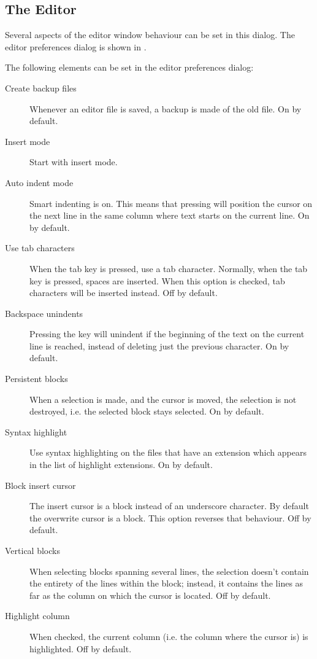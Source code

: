 \subsection{The Editor}
Several aspects of the editor window behaviour can be set in this dialog.
The editor preferences dialog is shown in .


The following elements can be set in the editor preferences dialog:
\begin{description}
\item[Create backup files]
Whenever an editor file is saved, a backup is made of the old file. On by
default.
\item[Insert mode] Start with insert mode.
\item[Auto indent mode]
Smart indenting is on. This means that pressing  will position the
cursor on the next line in the same column where text starts on the current
line. On by default.
\item[Use tab characters]
When the tab key is pressed, use a tab character. Normally, when the tab key
is pressed, spaces are inserted. When this option is checked, tab characters
will be inserted instead. Off by default.
\item[Backspace unindents]
Pressing the  key will unindent if the beginning of the text on
the current line is reached, instead of deleting just the previous
character. On by default.
\item[Persistent blocks]
When a selection is made, and the cursor is moved, the selection is not
destroyed, i.e. the selected block stays selected. On by default.
\item[Syntax highlight]
Use syntax highlighting on the files that have an extension which appears in
the list of highlight extensions. On by default.
\item[Block insert cursor]
The insert cursor is a block instead of an underscore character. By default
the overwrite cursor is a block. This option reverses that behaviour. Off by
default.
\item[Vertical blocks]
When selecting blocks spanning several lines, the selection doesn't 
contain the entirety of the lines within the block; instead, it 
contains the lines as far as the column on which the cursor is located.
Off by default.
\item[Highlight column]
When checked, the current column (i.e. the column where the cursor is) is
highlighted. Off by default.

\end{description}
